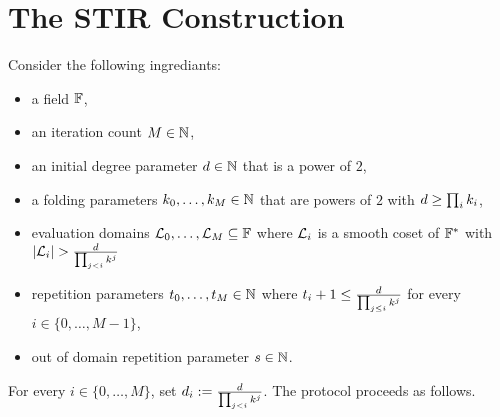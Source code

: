 \section{The STIR Construction}\label{subsec:stir_constr}
Consider the following ingrediants:
\begin{itemize}
    \item a field $\mathbb{F}$,
    \item an iteration count $M\in\mathbb{N}$,
    \item an initial degree parameter $d\in\mathbb{N}$ that is a power of $2$,
    \item a folding parameters $k_0,\ldots,k_M\in\mathbb{N}$ that are powers of $2$ with $d\geq\prod_{i}k_i$,
    \item evaluation domains $\mathcal{L}_0,\ldots,\mathcal{L}_M\subseteq\mathbb{F}$ where $\mathcal{L}_i$ is a smooth coset of ${\mathbb{F}}^*$ with $|\evaldomain_i|>\frac{\degree}{\prod_{j<i}k^j}$
    \item repetition parameters $t_0,\ldots,t_M\in\mathbb{N}$ where $t_i+1\leq\frac{d}{\prod_{j\leq i}k^j}$ for every $i\in\{0,\ldots,M-1\}$,
    \item out of domain repetition parameter $s\in\mathbb{N}$.
\end{itemize}
For every $i\in\{0,\ldots,M\}$, set $d_i:=\frac{d}{\prod_{j<i}k^j}$. The protocol proceeds as follows.

